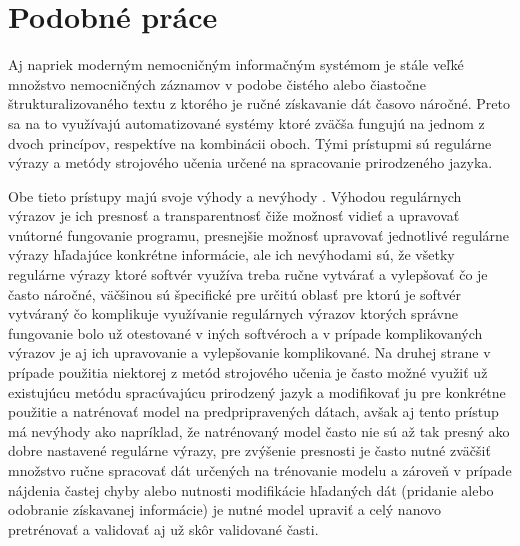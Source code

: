 \chapter{Podobné práce}

Aj napriek moderným nemocničným informačným
systémom je stále veľké množstvo nemocničných záznamov v
podobe čistého alebo čiastočne štrukturalizovaného 
textu z ktorého je ručné získavanie dát časovo náročné.
Preto sa na to využívajú automatizované systémy
ktoré zväčša fungujú na jednom z dvoch princípov, 
respektíve na kombinácii oboch. Tými prístupmi
sú regulárne výrazy a metódy strojového učenia
určené na spracovanie prirodzeného jazyka.

Obe tieto prístupy majú svoje výhody a nevýhody \cite{nlpAndRegex}. 
Výhodou regulárnych výrazov je ich presnosť a 
transparentnosť čiže možnosť vidieť a upravovať
vnútorné fungovanie programu, presnejšie možnosť 
upravovať jednotlivé regulárne výrazy
hľadajúce konkrétne informácie, ale ich nevýhodami sú,
že všetky regulárne výrazy ktoré softvér využíva 
treba ručne vytvárať a vylepšovať
čo je často náročné, väčšinou sú špecifické pre určitú oblasť
pre ktorú je softvér vytváraný čo komplikuje využívanie
regulárnych výrazov ktorých správne fungovanie bolo už 
otestované v iných softvéroch 
a v prípade komplikovaných výrazov je aj ich 
upravovanie a vylepšovanie komplikované. 
Na druhej strane v prípade použitia niektorej
z metód strojového učenia je často možné využiť už 
existujúcu metódu spracúvajúcu prirodzený jazyk a
modifikovať ju pre konkrétne použitie a natrénovať
model na predpripravených dátach, avšak aj tento prístup
má nevýhody ako napríklad, že natrénovaný model
často nie sú až tak presný ako dobre nastavené
regulárne výrazy, pre zvýšenie presnosti je často nutné
zväčšiť množstvo ručne spracovať dát určených na trénovanie 
modelu a zároveň v prípade nájdenia častej chyby alebo 
nutnosti modifikácie hľadaných dát (pridanie alebo 
odobranie získavanej informácie) je nutné model 
upraviť a celý nanovo pretrénovať a validovať aj už
skôr validované časti.

